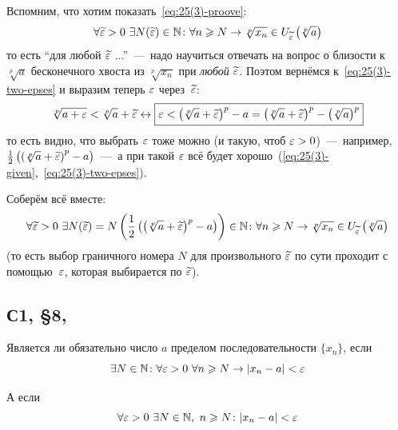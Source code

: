 \documentclass[a4paper,12pt]{article}
\begin{document}
\begin{solution}
    Вспомним, что хотим показать~\eqref{eq:25(3)-proove}:
    \[
      \forall \widetilde {\varepsilon} > 0\ \exists N(\widetilde {\varepsilon}) \in \mathbb N\colon \forall n \geqslant N \to \sqrt[p]{x_n} \in U_{\widetilde {\varepsilon}}\left(\sqrt[p]{a}\right)
    \]
    то есть ``для любой $\widetilde {\varepsilon}$ ...''~---~надо научиться отвечать на вопрос о близости к $\sqrt[p]{a}$ бесконечного хвоста из $\sqrt[p]{x_n}$ при \emph{любой} $\widetilde {\varepsilon}$.
    Поэтом вернёмся к~\eqref{eq:25(3)-two-epses} и выразим теперь $\varepsilon$ через~$\widetilde {\varepsilon}$:
    \[
      \sqrt[p]{a + \varepsilon} < \sqrt[p]{a} + \widetilde {\varepsilon} \leftrightarrow \boxed{\varepsilon < \left(\sqrt[p]{a} + \widetilde {\varepsilon}\right)^p - a =\left(\sqrt[p]{a} + \widetilde {\varepsilon}\right)^p - \left(\sqrt[p]{a}\right)^p}
    \]
    то есть видно, что выбрать $\varepsilon$ тоже можно (и такую, чтоб $\eps \hm> 0$)~---~например, $\frac{1}{2}\left(\left(\sqrt[p]{a} \hm+ \widetilde \eps\right)^p - a\right)$~---~а при такой $\varepsilon$ всё будет хорошо~(\ref{eq:25(3)-given},~\ref{eq:25(3)-two-epses}).
    
    Соберём всё вместе:
    \[
      \forall \widetilde {\varepsilon} > 0\ \exists N(\widetilde {\varepsilon}) = N\left(\frac{1}{2}\left(\left(\sqrt[p]{a} + \widetilde {\varepsilon}\right)^p - a\right)\right) \in \mathbb N\colon \forall n \geqslant N \to \sqrt[p]{x_n} \in U_{\widetilde {\varepsilon}}\left(\sqrt[p]{a}\right)
    \]
    (то есть выбор граничного номера $N$ для произвольного $\widetilde {\varepsilon}$ по сути проходит с помощью~$\varepsilon$, которая выбирается по $\widetilde {\varepsilon}$).
  \end{solution}
  
  
  \subsection{С1, \S 8, }
  
  Является ли обязательно число $a$ пределом последовательности $\{x_n\}$, если
  \begin{equation}\label{eq:28-point-1}
    \exists N \in \mathbb N\colon \forall \varepsilon > 0\ \forall n \geqslant N \to |x_n - a| < \varepsilon
  \end{equation}
  
  А если
  \begin{equation}\label{eq:28-point-2}
    \forall \varepsilon > 0\ \exists N \in \mathbb N,\ n \geqslant N\colon |x_n - a| < \varepsilon
  \end{equation}
  
\end{document}
